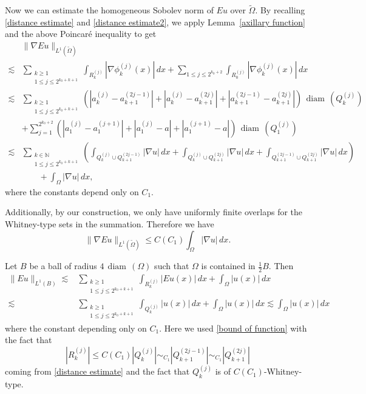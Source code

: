 \documentclass[reqno,11pt]{amsart}
\def\wz{\widetilde}
\def\ls{\lesssim}
\def\diam{{\mathop\mathrm{\,diam\,}}}
\numberwithin{equation}{section}
\theoremstyle{remark}
\begin{document}
Now we can estimate the homogeneous Sobolev norm of $Eu$ over $\wz \Omega$.
By recalling \eqref{distance estimate} and \eqref{distance estimate2}, we apply Lemma~\ref{axillary function} and the above Poincar\'e inequality  to get
\begin{align*}
& \|\nabla Eu\|_{L^{1}(\wz \Omega)} \\
\lesssim& \sum_{\substack{k\ge 1\\ 1\le j\le 2^{k_0+k+1}}} \int_{R_{k}^{(j)}} |\nabla \phi_{k}^{(j)}(x)| \, dx + \sum_{1\le j\le 2^{k_0+2}} \int_{R_{0}^{(j)}} |\nabla \phi_{k}^{(j)}(x)| \, dx \\
\lesssim& \sum_{\substack{k\ge 1 \\ 1\le j\le 2^{k_0+k+1}}} \left(|a_k^{(j)}-a_{k+1}^{(2j-1)}|+|a_k^{(j)}-a_{k+1}^{(2j)}| +|a_{k+1}^{(2j-1)}-a_{k+1}^{(2j)}|\right) \diam (Q_k^{(j)})\\
&  +\sum_{j=1}^{   2^{k_0+2}} \left(|a_1^{(j)}-a_{1}^{(j+1)}|+|a_1^{(j)}-a| +|a_{1}^{(j+1)}-a|\right)\diam (Q_1^{(j)}) \\ 
\lesssim& \sum_{\substack{k\in \mathbb N\\ 1\le j\le 2^{k_0+k+1}}} \left(  \int_{  Q_k^{(j)} \cup Q_{k+1}^{(2j-1)}} |\nabla u|\, dx +\int_{ Q_k^{(j)} \cup Q_{k+1}^{(2j)}} |\nabla u|\, dx + \int_{ Q_{k+1}^{(2j-1)} \cup Q_{k+1}^{(2j)}} |\nabla u|\, dx  \right) \\
& \qquad +\int_{\Omega}|\nabla u|\, dx,
\end{align*}
where the constants depend only on $C_1$. 

Additionally, by our construction, we only have uniformly finite overlaps for the Whitney-type sets in the summation. Therefore we have 
\begin{equation}\label{eqn201}
\|\nabla Eu\|_{L^{1}(\widetilde\Omega)} \le C(C_1) \int_{\Omega} |\nabla u|\, dx. 
\end{equation}


Let $B$ be a ball of radius $4\diam(\Omega)$ such that  $\Omega$ is  contained in $\frac 1 2 B$. Then 
\begin{align}\label{L1 control}
\| Eu\|_{L^{1}(B)}\ls & \sum_{\substack{k\ge 1\\ 1\le j\le 2^{k_0+k+1}}}\int_{R_k^{(j)}} |Eu(x)| \, dx + \int_{\Omega} |u(x)|\, dx \nonumber \\
\ls & \sum_{\substack{k\ge 1\\ 1\le j\le 2^{k_0+k+1}}}\int_{Q_k^{(j)}} |u(x)| \, dx  +\int_{\Omega} |u(x)|\, dx\ls \int_{\Omega} |u(x)|\, dx
\end{align}
where the constant depending only on $C_1$. Here we used \eqref{bound of function} with the fact that
$$|R_k^{(j)}|\le C(C_1) |Q_k^{(j)}|\sim_{C_1} |Q_{k+1}^{(2j-1)}| \sim_{C_1} |Q_{k+1}^{(2j)}| $$
coming from \eqref{distance estimate} and the fact that $Q_k^{(j)}$ is of $C(C_1)$-Whitney-type. 
\end{document}
